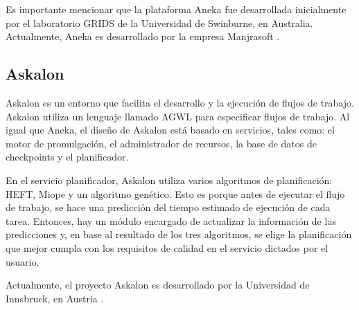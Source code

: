 Es importante mencionar que la plataforma Aneka fue desarrollada inicialmente por el laboratorio GRIDS de la Universidad de Swinburne, en Australia. Actualmente, Aneka es desarrollado por la empresa Manjrasoft \cite{aneka2014webpage}.

\subsection{Askalon}

Askalon \cite{fahringer2005askalon} es un entorno que facilita el desarrollo y la ejecución de flujos de trabajo. Askalon utiliza un lenguaje llamado AGWL para especificar flujos de trabajo. Al igual que Aneka, el diseño de Askalon está basado en servicios, tales como: el motor de promulgación, el administrador de recursos, la base de datos de checkpoints y el planificador.

En el servicio planificador, Askalon utiliza varios algoritmos de planificación: HEFT, Miope y un algoritmo genético. Esto es porque antes de ejecutar el flujo de trabajo, se hace una predicción del tiempo estimado de ejecución de cada tarea. Entonces, hay un módulo encargado de actualizar la información de las predicciones y, en base al resultado de los tres algoritmos, se elige la planificación que mejor cumpla con los requisitos de calidad en el servicio dictados por el usuario.

Actualmente, el proyecto Askalon es desarrollado por la Universidad de Innsbruck, en Austria \cite{askalon2014webpage}.